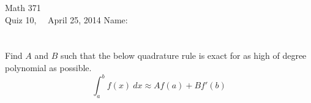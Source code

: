 \documentclass[addpoints, 11pt]{exam}
\begin{document}
Math 371 \\
Quiz 10, \ \ April 25, 2014
\hspace{2.in}
{Name:} {\underline {\hspace{2.15in}}} \\ \normalsize
\ \\ \ \\

Find $A$ and $B$ such that the below quadrature rule is exact for as high of degree polynomial as possible.
$$
\int_a^b f(x)~dx \approx Af(a) + Bf'(b)
$$
\end{document}
